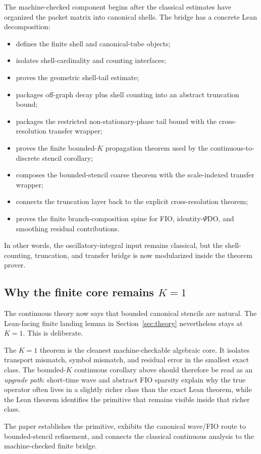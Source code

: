 The machine-checked component begins after the classical estimates have organized the packet matrix into canonical shells.  The bridge has a concrete Lean decomposition:
\begin{itemize}
\item {} defines the finite shell and canonical-tube objects;
\item {} isolates shell-cardinality and counting interfaces;
\item {} proves the geometric shell-tail estimate;
\item {} packages off-graph decay plus shell counting into an abstract truncation bound;
\item {} packages the restricted non-stationary-phase tail bound with the cross-resolution transfer wrapper;
\item {} proves the finite bounded-$K$ propagation theorem used by the continuous-to-discrete stencil corollary;
\item {} composes the bounded-stencil coarse theorem with the scale-indexed transfer wrapper;
\item {} connects the truncation layer back to the explicit cross-resolution theorem;
\item {} proves the finite branch-composition spine for FIO, identity-$\Psi$DO, and smoothing residual contributions.
\end{itemize}
In other words, the oscillatory-integral input remains classical, but the shell-counting, truncation, and transfer bridge is now modularized inside the theorem prover.

\subsection{Why the finite core remains \texorpdfstring{$K=1$}{K=1}}
\label{sec:single-packet}

The continuous theory now says that bounded canonical stencils are natural. The Lean-facing finite landing lemma in Section~\ref{sec:theory} nevertheless stays at $K=1$. This is deliberate.

The $K=1$ theorem is the cleanest machine-checkable algebraic core. It isolates transport mismatch, symbol mismatch, and residual error in the smallest exact class. The bounded-$K$ continuous corollary above should therefore be read as an \emph{upgrade path}: short-time wave and abstract FIO sparsity explain why the true operator often lives in a slightly richer class than the exact Lean theorem, while the Lean theorem identifies the primitive that remains visible inside that richer class.

The paper establishes the primitive, exhibits the canonical wave/FIO route to bounded-stencil refinement, and connects the classical continuous analysis to the machine-checked finite bridge.
